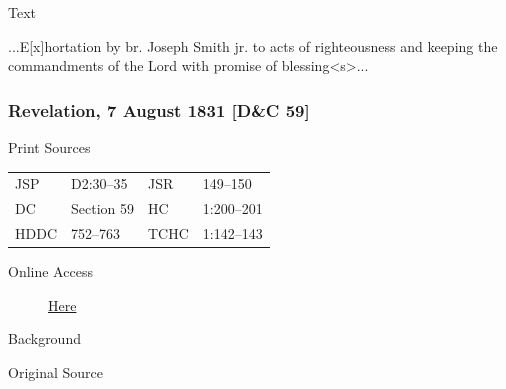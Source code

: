			\begin{description}
				\item[Text]
			\end{description}
			
				...E[x]hortation by br. Joseph Smith jr. to acts of righteousness and keeping the commandments of the Lord with promise of blessing<s>...
				
		\subsubsection{Revelation, 7 August 1831 [D\&C 59]}
			\label{EMS-1831-JS-7-AUG-1831}
		
			\begin{description}
				\item[Print Sources]
			\end{description}

				\begin{tabular}{p{0.5in}p{1in}p{0.5in}p{1in}}
				JSP	 	& D2:30--35		& JSR 		& 149--150 \\
				DC	 	& Section 59	& HC 		& 1:200--201 \\
				HDDC 	& 752--763		& TCHC 		& 1:142--143 \\
				\end{tabular}
			
			\begin{description}
				\item[Online Access] \href{https://www.josephsmithpapers.org/paper-summary/revelation-7-august-1831-dc-59/1}{Here}
			\end{description}
			
			\begin{description}
				\item[Background]
			\end{description}
			
			
			\begin{description}
				\item[Original Source]
			\end{description}
			
